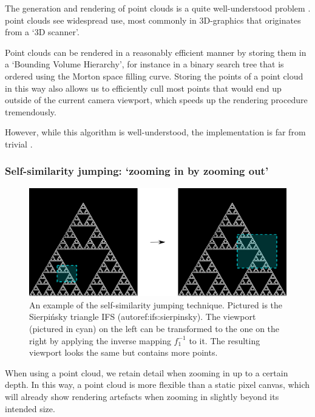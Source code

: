 \documentclass[11pt]{article}
\begin{document}
The generation and rendering of point clouds is a quite well-understood problem \cite{wimmer2006instant}. point clouds see widespread use,
most commonly in 3D-graphics that originates from a `3D scanner'.

Point clouds can be rendered in a reasonably efficient manner by storing them in a `Bounding Volume Hierarchy',
for instance in a binary search tree that is ordered using the Morton space filling curve. \cite{lauterbach2009construction}
Storing the points of a point cloud in this way also allows us to efficiently cull most points that would end up outside of the current camera viewport,
which speeds up the rendering procedure tremendously.

However, while this algorithm is well-understood, the implementation is far from trivial \cite{lauterbach2009construction}.

\subsubsection{Self-similarity jumping: `zooming in by zooming out'}
\label{sec:org9d7f8a7}
\label{subsection:self_similarity}

\begin{figure}

\includegraphics[width=\textwidth]{figures/sierpinsky_jump}
\caption{An example of the self-similarity jumping technique. Pictured is the Sierpi\'nsky triangle IFS (autoref:ifs:sierpinsky).
The viewport (pictured in cyan) on the left can be transformed to the one on the right by applying the inverse mapping $f_1^{-1}$ to it.
The resulting viewport looks the same but contains more points.}
\label{figure:sierpinsky_jump}
\end{figure}

When using a point cloud, we retain detail when zooming in up to a certain depth. In this way, a point cloud is more flexible than a 
static pixel canvas, which will already show rendering artefacts when zooming in slightly beyond its intended size.
\end{document}
